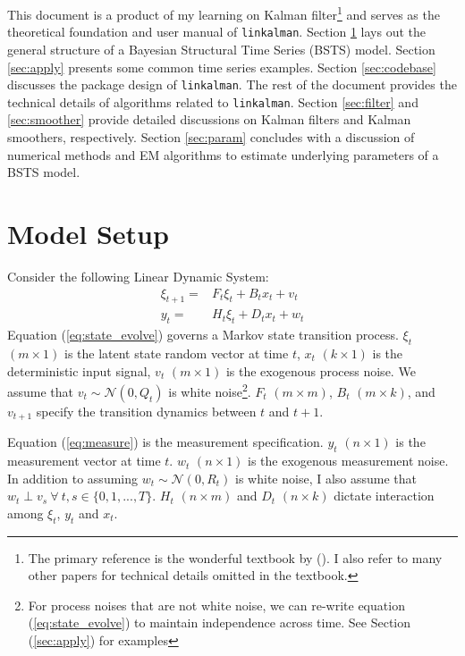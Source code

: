 \documentclass[10pt, titlepage]{article}
\numberwithin{equation}{section}
\begin{document}
This document is a product of my learning on Kalman filter\footnote{The primary reference is the wonderful textbook by (\cite{durbin_koopman_2001}). I also refer to many other papers for technical details omitted in the textbook.} and serves as the theoretical foundation and user manual of \texttt{linkalman}. Section \ref{sec:model_setup} lays out the general structure of a Bayesian Structural Time Series (BSTS) model. Section \ref{sec:apply} presents some common time series examples. Section \ref{sec:codebase} discusses the package design of \texttt{linkalman}. The rest of the document provides the technical details of algorithms related to \texttt{linkalman}. Section \ref{sec:filter} and \ref{sec:smoother} provide detailed discussions on Kalman filters and Kalman smoothers, respectively. Section \ref{sec:param} concludes with a discussion of numerical methods and EM algorithms to estimate underlying parameters of a BSTS model. 

\section{Model Setup} \label{sec:model_setup}
Consider the following Linear Dynamic System:
\begin{align}
    \xi_{t+1} = & F_{t}\xi_{t} + B_{t}x_t + v_t \label{eq:state_evolve} \\
    y_t = & H_t\xi_{t} + D_{t}x_t + w_t \label{eq:measure}
\end{align}
Equation (\ref{eq:state_evolve}) governs a Markov state transition process. $\xi_t$ $(m\times 1)$ is the latent state random vector at time $t$, $x_t$ $(k\times 1)$ is the deterministic input signal, $v_t$ $(m\times 1)$ is the exogenous process noise. We assume that $v_t\sim \mathcal{N}(0,Q_t)$ is white noise\footnote{For process noises that are not white noise, we can re-write equation (\ref{eq:state_evolve}) to maintain independence across time. See Section (\ref{sec:apply}) for examples}. $F_t$ $(m\times m)$, $B_t$ $(m\times k)$, and $v_{t+1}$ specify the transition dynamics between $t$ and $t+1$. 

Equation (\ref{eq:measure}) is the measurement specification. $y_t$ $(n\times 1)$ is the measurement vector at time $t$. $w_t$ $(n\times 1)$ is the exogenous measurement noise. In addition to assuming $w_t\sim \mathcal{N}(0, R_t)$ is white noise, I also assume that  $w_t \perp v_s \ \forall\  t,s\in\{0,1,...,T\}$. $H_t$ $(n\times m)$ and $D_t$ $(n\times k)$ dictate interaction among $\xi_t$, $y_t$ and $x_t$. 
\end{document}
